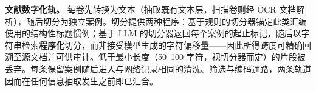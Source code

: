 \documentclass[11pt]{article}
\begin{document}
\textbf{{\cjkfont 文\allowbreak 献\allowbreak 数\allowbreak 字\allowbreak 化\allowbreak 轨\allowbreak 。}} {\cjkfont 每\allowbreak 卷\allowbreak 先\allowbreak 转\allowbreak 换\allowbreak 为\allowbreak 文\allowbreak 本\allowbreak （\allowbreak 抽\allowbreak 取\allowbreak 既\allowbreak 有\allowbreak 文\allowbreak 本\allowbreak 层\allowbreak ，\allowbreak 扫\allowbreak 描\allowbreak 卷\allowbreak 则\allowbreak 经} OCR {\cjkfont 文\allowbreak 档\allowbreak 解\allowbreak 析\allowbreak ）\allowbreak ，\allowbreak 随\allowbreak 后\allowbreak 切\allowbreak 分\allowbreak 为\allowbreak 独\allowbreak 立\allowbreak 案\allowbreak 例\allowbreak 。\allowbreak 切\allowbreak 分\allowbreak 提\allowbreak 供\allowbreak 两\allowbreak 种\allowbreak 程\allowbreak 序\allowbreak ：\allowbreak 基\allowbreak 于\allowbreak 规\allowbreak 则\allowbreak 的\allowbreak 切\allowbreak 分\allowbreak 器\allowbreak 锚\allowbreak 定\allowbreak 此\allowbreak 类\allowbreak 汇\allowbreak 编\allowbreak 使\allowbreak 用\allowbreak 的\allowbreak 结\allowbreak 构\allowbreak 性\allowbreak 标\allowbreak 题\allowbreak 惯\allowbreak 例\allowbreak ；\allowbreak 基\allowbreak 于} LLM {\cjkfont 的\allowbreak 切\allowbreak 分\allowbreak 器\allowbreak 返\allowbreak 回\allowbreak 每\allowbreak 个\allowbreak 案\allowbreak 例\allowbreak 的\allowbreak 起\allowbreak 止\allowbreak 标\allowbreak 记\allowbreak ，\allowbreak 随\allowbreak 后\allowbreak 以\allowbreak 字\allowbreak 符\allowbreak 串\allowbreak 检\allowbreak 索}\textbf{{\cjkfont 程\allowbreak 序\allowbreak 化}}{\cjkfont 切\allowbreak 分\allowbreak ，\allowbreak 而\allowbreak 非\allowbreak 接\allowbreak 受\allowbreak 模\allowbreak 型\allowbreak 生\allowbreak 成\allowbreak 的\allowbreak 字\allowbreak 符\allowbreak 偏\allowbreak 移\allowbreak 量}------{\cjkfont 因\allowbreak 此\allowbreak 所\allowbreak 得\allowbreak 跨\allowbreak 度\allowbreak 可\allowbreak 精\allowbreak 确\allowbreak 回\allowbreak 溯\allowbreak 至\allowbreak 源\allowbreak 文\allowbreak 档\allowbreak 并\allowbreak 可\allowbreak 供\allowbreak 审\allowbreak 计\allowbreak 。\allowbreak 低\allowbreak 于\allowbreak 最\allowbreak 小\allowbreak 长\allowbreak 度\allowbreak （}50--100 {\cjkfont 字\allowbreak 符\allowbreak ，\allowbreak 视\allowbreak 切\allowbreak 分\allowbreak 器\allowbreak 而\allowbreak 定\allowbreak ）\allowbreak 的\allowbreak 片\allowbreak 段\allowbreak 被\allowbreak 丢\allowbreak 弃\allowbreak 。\allowbreak 每\allowbreak 条\allowbreak 保\allowbreak 留\allowbreak 案\allowbreak 例\allowbreak 随\allowbreak 后\allowbreak 进\allowbreak 入\allowbreak 与\allowbreak 网\allowbreak 络\allowbreak 记\allowbreak 录\allowbreak 相\allowbreak 同\allowbreak 的\allowbreak 清\allowbreak 洗\allowbreak 、\allowbreak 筛\allowbreak 选\allowbreak 与\allowbreak 编\allowbreak 码\allowbreak 通\allowbreak 路\allowbreak ，\allowbreak 两\allowbreak 条\allowbreak 轨\allowbreak 道\allowbreak 因\allowbreak 而\allowbreak 在\allowbreak 任\allowbreak 何\allowbreak 信\allowbreak 息\allowbreak 抽\allowbreak 取\allowbreak 发\allowbreak 生\allowbreak 之\allowbreak 前\allowbreak 即\allowbreak 已\allowbreak 汇\allowbreak 合\allowbreak 。}
\end{document}
